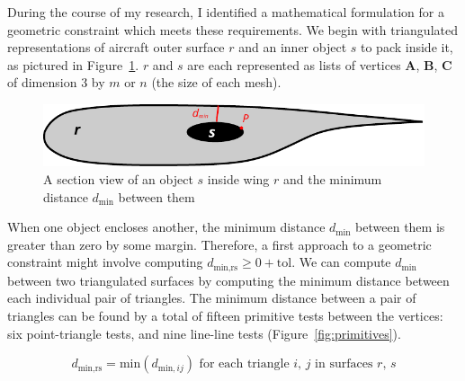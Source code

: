\documentclass[11pt,letterpaper]{article}
\begin{document}
\qquad During the course of my research, I identified a mathematical formulation for a geometric constraint which meets these requirements.
We begin with triangulated representations of aircraft outer surface $r$ and an inner object $s$ to pack inside it, as pictured in Figure~\ref{fig:schematic}.
$r$ and $s$ are each represented as lists of vertices $\textbf{A}$, $\textbf{B}$, $\textbf{C}$ of dimension 3 by $m$ or $n$ (the size of each mesh).

\begin{figure}[ht]
  \centering
  \includegraphics[width=0.45\linewidth]{figures/schematic}
  \caption{A section view of an object $s$ inside wing $r$ and the minimum distance $d_\text{min}$ between them}
  \label{fig:schematic}
\end{figure}

\qquad When one object encloses another, the minimum distance $d_\text{min}$ between them is greater than zero by some margin.
Therefore, a first approach to a geometric constraint might involve computing $d_\text{min,rs} \geq 0 + \text{tol}$.
We can compute $d_\text{min}$ between two triangulated surfaces by computing the minimum distance between each individual pair of triangles.
The minimum distance between a pair of triangles can be found by a total of fifteen primitive tests between the vertices: six point-triangle tests, and nine line-line tests (Figure~\ref{fig:primitives}). %

\begin{equation}
  \label{eq:dmin}
  d_\text{min,rs} = \text{min}(d_{\text{min},ij}) \text{ for each triangle } i, \, j \text{ in surfaces } r, \, s
\end{equation}
\end{document}
